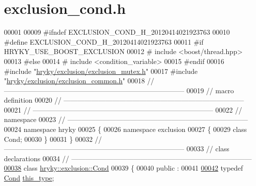 \hypertarget{exclusion__cond_8h_source}{\section{exclusion\-\_\-cond.\-h}
}

\begin{DoxyCode}
00001 
00009 \textcolor{preprocessor}{#ifndef EXCLUSION\_COND\_H\_20120414021923763}
00010 \textcolor{preprocessor}{}\textcolor{preprocessor}{#define EXCLUSION\_COND\_H\_20120414021923763}
00011 \textcolor{preprocessor}{}\textcolor{preprocessor}{#if HRYKY\_USE\_BOOST\_EXCLUSION}
00012 \textcolor{preprocessor}{}\textcolor{preprocessor}{#   include <boost/thread.hpp>}
00013 \textcolor{preprocessor}{#else}
00014 \textcolor{preprocessor}{}\textcolor{preprocessor}{#   include <condition\_variable>}
00015 \textcolor{preprocessor}{#endif}
00016 \textcolor{preprocessor}{}\textcolor{preprocessor}{#include "\hyperlink{exclusion__mutex_8h}{hryky/exclusion/exclusion_mutex.h}"}
00017 \textcolor{preprocessor}{#include "\hyperlink{exclusion__common_8h}{hryky/exclusion/exclusion_common.h}"}
00018 \textcolor{comment}{//
      ------------------------------------------------------------------------------}
00019 \textcolor{comment}{// macro definition}
00020 \textcolor{comment}{//
      ------------------------------------------------------------------------------}
00021 \textcolor{comment}{//
      ------------------------------------------------------------------------------}
00022 \textcolor{comment}{// namespace}
00023 \textcolor{comment}{//
      ------------------------------------------------------------------------------}
00024 \textcolor{keyword}{namespace }hryky
00025 \{
00026 \textcolor{keyword}{namespace }exclusion
00027 \{
00029     \textcolor{keyword}{class }Cond;
00030 \}
00031 \}
00032 \textcolor{comment}{//
      ------------------------------------------------------------------------------}
00033 \textcolor{comment}{// class declarations}
00034 \textcolor{comment}{//
      ------------------------------------------------------------------------------}
\hypertarget{exclusion__cond_8h_source_l00038}{}\hyperlink{classhryky_1_1exclusion_1_1_cond}{00038} \textcolor{comment}{}\textcolor{keyword}{class }\hyperlink{classhryky_1_1exclusion_1_1_cond}{hryky::exclusion::Cond}
00039 \{
00040 \textcolor{keyword}{public} :
00041 
\hypertarget{exclusion__cond_8h_source_l00042}{}\hyperlink{classhryky_1_1exclusion_1_1_cond_af877ae99e3b153e94c01d0e15b6a0acc}{00042}     \textcolor{keyword}{typedef} \hyperlink{classhryky_1_1exclusion_1_1_cond}{Cond} \hyperlink{classhryky_1_1exclusion_1_1_cond_af877ae99e3b153e94c01d0e15b6a0acc}{this_type};

\end{DoxyCode}
